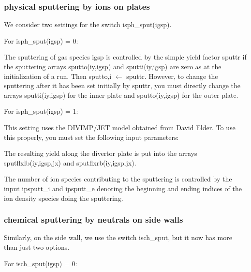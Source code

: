 \documentclass [12pt]{article}
\def\hsa{\hskip.4truein}
\def\hsp6{\hskip.6truein}
\begin{document}
\subsubsection{physical sputtering by ions on plates}

We consider two settings for the switch {\sf isph\_sput(igsp)}.

\noindent
For {\sf isph\_sput(igsp)} = 0:

The sputtering of gas species igsp is controlled by the simple yield factor
{\sf sputtr} if the sputtering arrays {\sf sputto(iy,igsp)} and {\sf
  sputti(iy,igsp)} are zero as at the initialization of a run.  Then {\sf
  sputto,i $\leftarrow$ sputtr}.  However, to change the sputtering after it
has been set initially by {\sf sputtr}, you must directly change the arrays
{\sf sputti(iy,igsp)} for the inner plate and {\sf sputto(iy,igsp)} for the
outer plate.

\noindent
For {\sf isph\_sput(igsp)} = 1:

     This setting uses the DIVIMP/JET model obtained from David Elder.  To use
this properly, you must set the following input parameters:
{\sf
{}
}
The resulting yield along the divertor plate is put into the arrays
{\sf sputflxlb(iy,igsp,jx)} and {\sf sputflxrb(iy,igsp,jx)}.

The number of ion species contributing to the sputtering is controlled by the
input {\sf ipsputt_i} and {\sf ipsputt_e} denoting the beginning and ending 
indices of the ion density species doing the sputtering.

\subsubsection{chemical sputtering by neutrals on side walls}
Similarly, on the side wall, we use the switch {\sf isch\_sput}, but it now
has more than just two options.

\noindent
For {\sf isch\_sput(igsp)} = 0:
\end{document}
